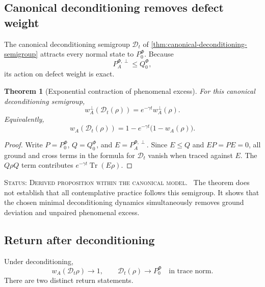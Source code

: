 \documentclass[11pt,reqno]{scrartcl}
\newcommand{\PzeroF}{P_{0}^{\Phi}}
\newcommand{\QzeroF}{Q_{0}^{\Phi}}
\newcommand{\statuslabel}[1]{\par\smallskip\noindent\textsc{Status: #1.}\ }
\newcommand{\defectProjF}{P_{A}^{\Phi,\perp}}
\DeclareMathOperator{\Tr}{Tr}
\newcommand{\Decond}{\mathcal D}
\newcommand{\presentWeight}{w_{A}}
\newcommand{\defectWeight}{w_{A}^{\perp}}
\theoremstyle{plain}
\newtheorem{theorem}{Theorem}[section]
\theoremstyle{definition}
\theoremstyle{remark}
\begin{document}
\subsection{Canonical deconditioning removes defect weight}

The canonical deconditioning semigroup $\Decond_t$ of
\cref{thm:canonical-deconditioning-semigroup} attracts every normal state to
$\PzeroF$.  Because
\begin{equation}
  \defectProjF\leq\QzeroF,
  \label{eq:excess-under-ground-complement}
\end{equation}
its action on defect weight is exact.

\begin{theorem}[Exponential contraction of phenomenal excess]
\label{thm:deconditioning-contracts-excess}
For this canonical deconditioning semigroup,
\begin{equation}
  \boxed{
  \defectWeight(\Decond_t(\rho))
  =e^{-\gamma t}\defectWeight(\rho).}
  \label{eq:excess-exponential-decay}
\end{equation}
Equivalently,
\begin{equation}
  \boxed{
  \presentWeight(\Decond_t(\rho))
  =1-e^{-\gamma t}
    \bigl(1-\presentWeight(\rho)\bigr).}
  \label{eq:actualizability-increases}
\end{equation}
\end{theorem}

\begin{proof}
Write $P=\PzeroF$, $Q=\QzeroF$, and $E=\defectProjF$.  Since $E\leq Q$ and
$EP=PE=0$, all ground and cross terms in the formula for $\Decond_t$ vanish
when traced against $E$.  The $Q\rho Q$ term contributes
$e^{-\gamma t}\Tr(E\rho)$.
\end{proof}

\statuslabel{Derived proposition within the canonical model} The theorem does
not establish that all contemplative practice follows this semigroup.  It
shows that the chosen minimal deconditioning dynamics simultaneously removes
ground deviation and unpaired phenomenal excess.

\subsection{Return after deconditioning}

Under deconditioning,
\begin{equation}
  \presentWeight(\Decond_t\rho)\longrightarrow1,
  \qquad
  \Decond_t(\rho)\longrightarrow\PzeroF
  \quad\text{in trace norm}.
  \label{eq:deconditioning-return-limits}
\end{equation}
There are two distinct return statements.
\end{document}
